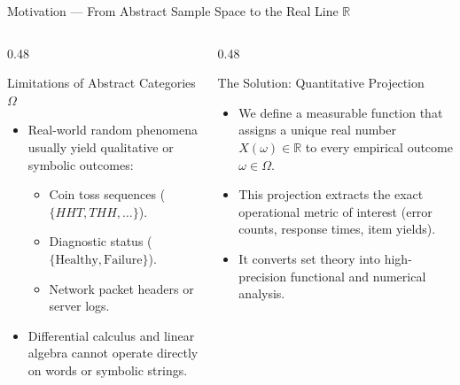 \documentclass[10pt, aspectratio=169]{beamer}
\begin{document}
\begin{frame}{Motivation — From Abstract Sample Space to the Real Line $\mathbb{R}$}
  \begin{columns}[T]
    \begin{column}{0.48\textwidth}
      \begin{block}{Limitations of Abstract Categories $\Omega$}
        \small
        \begin{itemize}\itemsep=0.1cm
          \item Real-world random phenomena usually yield qualitative or symbolic outcomes:
          \begin{itemize}
            \item Coin toss sequences ($\{HHT, THH, \dots\}$).
            \item Diagnostic status ($\{\text{Healthy}, \text{Failure}\}$).
            \item Network packet headers or server logs.
          \end{itemize}
          \item Differential calculus and linear algebra cannot operate directly on words or symbolic strings.
        \end{itemize}
      \end{block}
    \end{column}
    \begin{column}{0.48\textwidth}
      \begin{alertblock}{The Solution: Quantitative Projection}
        \small
        \begin{itemize}\itemsep=0.1cm
          \item We define a measurable function that assigns a unique real number $X(\omega) \in \mathbb{R}$ to every empirical outcome $\omega \in \Omega$.
          \item This projection extracts the exact operational metric of interest (error counts, response times, item yields).
          \item It converts set theory into high-precision functional and numerical analysis.
        \end{itemize}
      \end{alertblock}
    \end{column}
  \end{columns}
\end{frame}
\end{document}
